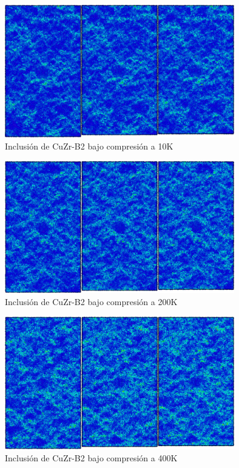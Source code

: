 \begin{figure}[htp]
\centering
\includegraphics[width=10cm]{../ResumenImagenes/Figures/NanoParticles/Snapshots/B2SphereCompression_10K_Snapshots.png}
\caption[Inclusión de CuZr-B2 bajo compresión a 10K]{Inclusión de CuZr-B2 bajo compresión a 10K}
\label{C4:fg:snapshot_comp_B2_10K}
\end{figure}

\begin{figure}[htp]
\centering
\includegraphics[width=10cm]{../ResumenImagenes/Figures/NanoParticles/Snapshots/B2SphereCompression_200K_Snapshots.png}
\caption[Inclusión de CuZr-B2 bajo compresión a 200K]{Inclusión de CuZr-B2 bajo compresión a 200K}
\label{C4:fg:snapshot_comp_B2_200K}
\end{figure}


\begin{figure}[htp]
\centering
\includegraphics[width=10cm]{../ResumenImagenes/Figures/NanoParticles/Snapshots/B2SphereCompression_400K_Snapshots.png}
\caption[Inclusión de CuZr-B2 bajo compresión a 400K]{Inclusión de CuZr-B2 bajo compresión a 400K}
\label{C4:fg:snapshot_comp_B2_400K}
\end{figure}

